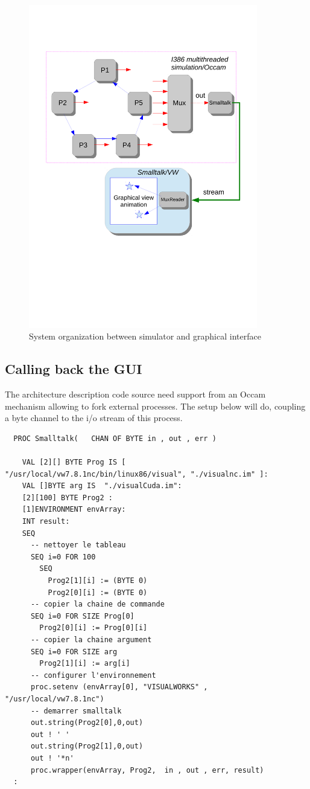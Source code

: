 \begin{figure}[hbtp]
\begin{center} 
\includegraphics[width=10cm] {mux4-st.pdf}
\caption{System organization between simulator and graphical interface}
\label{fig:mux4-st}
\end{center}
\end{figure}
 

\subsection{Calling back the GUI}

The architecture description code source need support from an Occam mechanism allowing 
to fork external processes. The setup below will do, coupling a byte channel
to the i/o stream of this process.

\begin{lstlisting}
  PROC Smalltalk(   CHAN OF BYTE in , out , err )

    VAL [2][] BYTE Prog IS [ "/usr/local/vw7.8.1nc/bin/linux86/visual", "./visualnc.im" ]:
    VAL []BYTE arg IS  "./visualCuda.im":
    [2][100] BYTE Prog2 :
    [1]ENVIRONMENT envArray:
    INT result:
    SEQ
      -- nettoyer le tableau
      SEQ i=0 FOR 100
        SEQ
          Prog2[1][i] := (BYTE 0)
          Prog2[0][i] := (BYTE 0)
      -- copier la chaine de commande
      SEQ i=0 FOR SIZE Prog[0]
        Prog2[0][i] := Prog[0][i]
      -- copier la chaine argument
      SEQ i=0 FOR SIZE arg
        Prog2[1][i] := arg[i]
      -- configurer l'environnement
      proc.setenv (envArray[0], "VISUALWORKS" , "/usr/local/vw7.8.1nc")
      -- demarrer smalltalk
      out.string(Prog2[0],0,out)
      out ! ' '
      out.string(Prog2[1],0,out)
      out ! '*n'
      proc.wrapper(envArray, Prog2,  in , out , err, result)
  :
\end{lstlisting}


